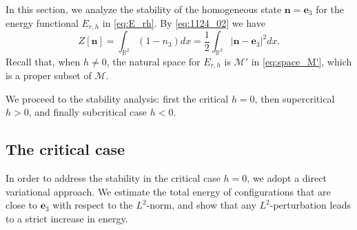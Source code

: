\documentclass{amsart}
\numberwithin{equation}{section}
\theoremstyle{definition}
\theoremstyle{remark}
\newcommand{\R}{\mathbb{R}}
\newcommand{\boM}{\mathcal{M}}
\newcommand{\bn}{{\mathbf{n}}}
\newcommand{\boe}{{\mathbf{e}}}
\begin{document}
In this section, we analyze the stability of the homogeneous state $\bn = \boe_3$ for the energy functional $E_{r,h}$ in \eqref{eq:E_rh}.
By \eqref{eq:1124_02} we have
\begin{equation}\label{eq:ZL^2}
	Z[\bn] = \int_{\R^2}(1-n_3) dx = \frac12 \int_{\R^2}|\bn-\boe_3|^2 dx.
\end{equation}  
Recall that, when $h \neq 0$, the natural space for $E_{r,h}$ is $\boM'$ in \eqref{eq:space_M'}, which is a proper subset of $\boM$. 

 
We proceed to the stability analysis: first the critical $h=0$, then supercritical $h>0$, and finally subcritical case $h<0$.


\subsection{The critical case} %

In order to address the stability in the critical case $h=0$, we adopt a direct variational approach. We estimate the total energy of configurations that are close to $\boe_3$ with respect to the $L^2$-norm, and show that any $L^2$-perturbation leads to a strict increase in energy.
\end{document}
